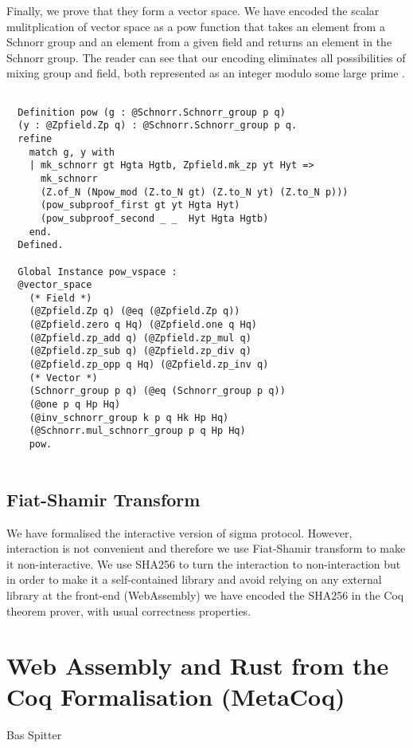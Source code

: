 \documentclass[conference,compsoc]{IEEEtran}
\begin{document}
Finally, we prove that they form a vector space. 
We have encoded the scalar mulitplication of 
vector space as a pow function that takes an element from 
a Schnorr group and an element from 
a given field and returns an element in the 
Schnorr group.  The reader can see that our encoding eliminates all 
possibilities of mixing group and field, both represented 
as an integer modulo some large 
prime \cite{10.1007/978-3-662-63958-0_24}.

\begin{lstlisting}[frame=single, language=Coq, caption={Definition of Natural Number},
  label={ind_nat},captionpos=t, basicstyle=\ttfamily\footnotesize,
  abovecaptionskip=-\medskipamount]

  Definition pow (g : @Schnorr.Schnorr_group p q) 
  (y : @Zpfield.Zp q) : @Schnorr.Schnorr_group p q.
  refine 
    match g, y with 
    | mk_schnorr gt Hgta Hgtb, Zpfield.mk_zp yt Hyt => 
      mk_schnorr  
      (Z.of_N (Npow_mod (Z.to_N gt) (Z.to_N yt) (Z.to_N p))) 
      (pow_subproof_first gt yt Hgta Hyt)
      (pow_subproof_second _ _  Hyt Hgta Hgtb)
    end.
  Defined.

  Global Instance pow_vspace : 
  @vector_space 
    (* Field *)
    (@Zpfield.Zp q) (@eq (@Zpfield.Zp q))
    (@Zpfield.zero q Hq) (@Zpfield.one q Hq)
    (@Zpfield.zp_add q) (@Zpfield.zp_mul q)
    (@Zpfield.zp_sub q) (@Zpfield.zp_div q)
    (@Zpfield.zp_opp q Hq) (@Zpfield.zp_inv q)
    (* Vector *)
    (Schnorr_group p q) (@eq (Schnorr_group p q))
    (@one p q Hp Hq) 
    (@inv_schnorr_group k p q Hk Hp Hq)
    (@Schnorr.mul_schnorr_group p q Hp Hq)
    pow.
  
\end{lstlisting}
  
  
 
\subsection{Fiat-Shamir Transform}
 We have formalised the interactive version of sigma protocol. However,
 interaction is not convenient and therefore
 we use Fiat-Shamir transform to make it non-interactive. We use SHA256 
 to turn the interaction to non-interaction but in order to 
 make it a self-contained library and 
 avoid relying on any external library at the front-end (WebAssembly)
 we have encoded the SHA256 in the Coq theorem prover, with usual correctness 
 properties. 


\section{Web Assembly and Rust from the Coq Formalisation (MetaCoq)}
  Bas Spitter
\end{document}
